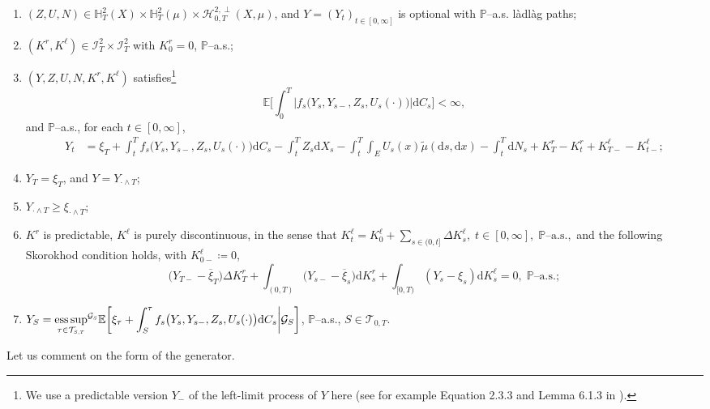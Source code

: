 \documentclass[10pt]{article} %
\newcommand\cG{\mathcal G}
\newcommand\cH{\mathcal H}
\newcommand\cI{\mathcal I}
\newcommand\cT{\mathcal T}
\newcommand{\smalltext}[1]{\text{\fontsize{4}{4}\selectfont$#1$}}
\def \E{\mathbb{E}}
\def \H{\mathbb{H}}
\def \P{\mathbb{P}}
\newcommand{\1}{\mathbf{1}}
\def\d{\mathrm{d}}
\DeclareMathOperator*{\esssup}{ess\,sup}
\begin{document}
\begin{enumerate}[{\bf (R1)}, leftmargin=0.9cm]
	\item \label{cond::integ_mart}$(Z,U,N) \in \H^2_T(X) \times \H^2_T(\mu) \times \cH^{2,\perp}_{0,T}(X,\mu)$, and $Y = (Y_t)_{t \in [0,\infty]}$ is optional with $\P$--a.s. l\`adl\`ag paths;
	\item \label{cond::integ_y_and_k} $(K^r,K^\ell) \in \cI^2_T \times  \cI^2_T$ with $K^r_0 = 0$, $\P$--a.s.;
	\item \label{cond::refl_eq} $(Y,Z,U,N,K^r,K^\ell)$ satisfies\footnote{We use a predictable version $Y_-$ of the left-limit process of $Y$ here (see for example Equation 2.3.3 and Lemma 6.1.3 in \cite{weizsaecker1990stochastic}).}
		\begin{equation*}
			\E\bigg[\int_0^T \big|f_s\big(Y_s,Y_{s-},Z_s,U_s(\cdot)\big)\big|\d C_s\bigg] < \infty,
		\end{equation*}
	and $\P$--a.s., for each $t \in [0,\infty]$,
		\begin{align*}
			Y_t &= \xi_T + \int_t^T f_s\big(Y_s,Y_{s-},Z_s,U_s(\cdot)\big) \d C_s - \int_t^T Z_s \d X_s - \int_t^T\int_E U_s(x)\tilde\mu(\d s, \d x) - \int_t^T\d N_s+ K^r_T - K^r_t + K^{\ell}_{T-} - K^{\ell}_{t-};
		\end{align*}
	\item \label{cond::y_equals_xi}$Y_T = \xi_T$, and $Y = Y_{\cdot \land T}$;
	\item \label{cond::y_greater_xi}$Y_{\cdot \land T} \geq \xi_{\cdot \land T}$;
	\item \label{cond::increasing_proc} $K^r$ is predictable, $K^\ell$ is purely discontinuous, in the sense that $K^\ell_t = K^\ell_0 + \sum_{s \in (0,t] } \Delta K^\ell_s, \; t \in [0,\infty], \; \text{$\P$--a.s.},$
		 and the following Skorokhod condition holds, with $K^\ell_{0-} \coloneqq 0$,
		\[
		 \big(Y_{T-} - \overline{\xi}_T\big) \Delta K^r_T + \int_{(0,T)} \big(Y_{s-} - \overline{\xi}_s\big) \d K^r_s + \int_{[0,T)} (Y_s - \xi_s) \d K^\ell_s = 0, \;\text{$\P$--a.s.};
		\]
	
	\item \label{cond::repre_Y} $\displaystyle Y_S = {\esssup_{\tau \in \cT_{\smalltext{S}\smalltext{,}\smalltext{T}}}}^{\cG_\smalltext{S}} \E\bigg[ \xi_\tau + \int_S^\tau f_s\big(Y_s,Y_{s-},Z_s,U_s(\cdot)\big) \d C_s \bigg| \cG_S\bigg]$, $\P$--a.s., $S \in \cT_{0,T}$.
\end{enumerate}

Let us comment on the form of the generator.
\end{document}

